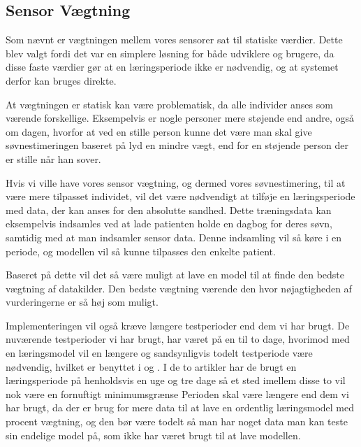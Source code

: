 \subsection{Sensor Vægtning}\label{subsec:sensorvaegtsoevn}
Som nævnt er vægtningen mellem vores sensorer sat til statiske værdier.
Dette blev valgt fordi det var en simplere løsning for både udviklere og brugere, da disse faste værdier gør at en læringsperiode ikke er nødvendig, og at systemet derfor kan bruges direkte.

At vægtningen er statisk kan være problematisk, da alle individer anses som værende forskellige. 
Eksempelvis er nogle personer mere støjende end andre, også om dagen, hvorfor at ved en stille person kunne det være man skal give søvnestimeringen baseret på lyd en mindre vægt, end for en støjende person der er stille når han sover.

Hvis vi ville have vores sensor vægtning, og dermed vores søvnestimering, til at være mere tilpasset individet, vil det være nødvendigt at tilføje en læringsperiode med data, der kan anses for den absolutte sandhed.
Dette træningsdata kan eksempelvis indsamles ved at lade patienten holde en dagbog for deres søvn, samtidig med at man indsamler sensor data.
Denne indsamling vil så køre i en periode, og modellen vil så kunne tilpasses den enkelte patient.

Baseret på dette vil det så være muligt at lave en model til at finde den bedste vægtning af datakilder.
Den bedste vægtning værende den hvor nøjagtigheden af vurderingerne er så høj som muligt.

Implementeringen vil også kræve længere testperioder end dem vi har brugt.
De nuværende testperioder vi har brugt, har været på en til to dage, hvorimod med en læringsmodel vil en længere og sandsynligvis todelt testperiode være nødvendig, hvilket er benyttet i \citet{6563918} og \citet{Min:2014:TNT:2556288.2557220}.
I de to artikler har de brugt en læringsperiode på henholdsvis en uge og tre dage så et sted imellem disse to vil nok være en fornuftigt minimumsgrænse
Perioden skal være længere end dem vi har brugt, da der er brug for mere data til at lave en ordentlig læringsmodel med procent vægtning, og den bør være todelt så man har noget data man kan teste sin endelige model på, som ikke har været brugt til at lave modellen.
